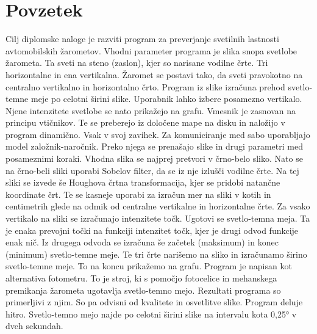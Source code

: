 \documentclass[oneside, a4paper, 12pt]{book}
\renewcommand{\chaptermark}[1]%
{\markboth{\MakeUppercase{\thechapter.\ #1}}{}} \renewcommand{\sectionmark}[1]%
\newcommand{\clearemptydoublepage}{\newpage{\pagestyle{empty}\cleardoublepage}}
\begin{document}
\def\thepage{}%
\tableofcontents{}


\clearemptydoublepage

\chapter*{Povzetek}
\chaptermark{}
Cilj diplomske naloge je razviti program za preverjanje svetilnih lastnosti avtomobilskih žarometov. Vhodni parameter programa je slika snopa svetlobe žarometa. Ta sveti na steno (zaslon), kjer so narisane vodilne črte. Tri horizontalne in ena vertikalna. Žaromet se postavi tako, da sveti pravokotno na centralno vertikalno in horizontalno črto. Program iz slike izračuna prehod svetlo-temne meje po celotni širini slike. Uporabnik lahko izbere posamezno vertikalo. Njene intenzitete svetlobe se nato prikažejo na grafu. Vmesnik je zasnovan na principu vtičnikov. Te se preberejo iz določene mape na disku in naložijo v program dinamično. Vsak v svoj zavihek. Za komuniciranje med sabo uporabljajo model založnik-naročnik. Preko njega se prenašajo slike in drugi parametri med posameznimi koraki. Vhodna slika se najprej pretvori v črno-belo sliko. Nato se na črno-beli sliki uporabi Sobelov filter, da se iz nje izlušči vodilne črte. Na tej sliki se izvede še Houghova črtna transformacija, kjer se pridobi natančne koordinate črt. Te se kasneje uporabi za izračun mer na sliki v kotih in centimetrih glede na odmik od centralne vertikalne in horizontalne črte. Za vsako vertikalo na sliki se izračunajo intenzitete točk. Ugotovi se svetlo-temna meja. Ta je enaka prevojni točki na funkciji intenzitet točk, kjer je drugi odvod funkcije enak nič. Iz drugega odvoda se izračuna še začetek (maksimum) in konec (minimum) svetlo-temne meje. Te tri črte narišemo na sliko in izračunamo širino svetlo-temne meje. To na koncu prikažemo na grafu. Program je napisan kot alternativa fotometru. To je stroj, ki s pomočjo fotocelice in mehanskega premikanja žarometa ugotavlja svetlo-temno mejo. Rezultati programa so primerljivi z njim. So pa odvisni od kvalitete in osvetlitve slike. Program deluje hitro. Svetlo-temno mejo najde po celotni širini slike na intervalu kota 0,25° v dveh sekundah.
\clearemptydoublepage

\end{document}
